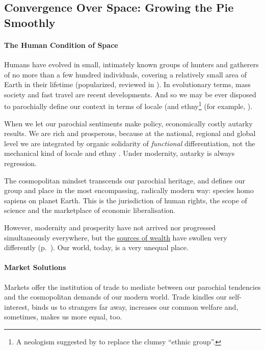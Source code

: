 


\subsection[Convergence Over Space]{Convergence Over Space: Growing the Pie Smoothly} \label{sec:space}

\paragraph{The Human Condition of Space} Humans have evolved in small, intimately known groups of hunters and gatherers of no more than a few hundred individuals, covering a relatively small area of Earth in their lifetime (popularized, reviewed in \citealt{Diamond1997}). In evolutionary terms, mass society and fast travel are recent developments. And so we may be ever disposed to parochially define our context in terms of locale (and ethny\footnote{
	A neologism suggested by \citeauthor{Van-den-Berghe-1981-aa} to replace the clumsy ``ethnic group''.}
(for example, \citealt{Van-den-Berghe-1981-aa}).

When we let our parochial sentiments make policy, economically costly autarky results. We are rich and prosperous, because at the national, regional and global level we are integrated by organic solidarity of \emph{functional} differentiation, not the mechanical kind of locale and ethny \citep{Durkheim-1893-aa}. Under modernity, autarky is always regression.

The cosmopolitan mindset transcends our parochial heritage, and defines our group and place in the most encompassing, radically modern way: species homo sapiens on planet Earth. This is the jurisdiction of human rights, the scope of science and the marketplace of economic liberalisation.

However, modernity and prosperity have not arrived nor progressed simultaneously everywhere, but the  \hyperref[sec:sources-of-wealth]{sources of wealth} have swollen very differently (p.~\pageref{sec:sources-of-wealth}). Our world, today, is a very unequal place. 

\paragraph{Market Solutions}  \label{sec:trade} Markets offer the institution of trade to mediate between our parochial tendencies and the cosmopolitan demands of our modern world. Trade kindles our self-interest, binds us to strangers far away, increases our common welfare and, sometimes, makes us more equal, too. %

